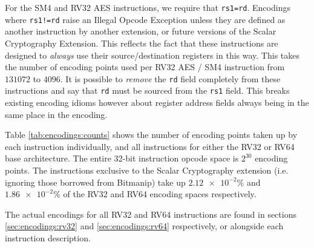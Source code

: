 For the SM4 and RV32 AES instructions, we require that {\tt rs1=rd}.
Encodings where {\tt rs1!=rd} raise an Illegal Opcode Exception unless
they are defined as another instruction by another extension, or
future versions of the Scalar Cryptography Extension.
This reflects the fact that these instructions are designed to {\em always}
use their source/destination registers in this way.
This takes the number of encoding points used per RV32 AES / SM4 instruction
from $131072$ to $4096$.
It is possible to {\em remove} the {\tt rd} field completely from these
instructions and say that {\tt rd} must be sourced from the {\tt rs1}
field.
This breaks existing encoding idioms however about register address fields
always being in the same place in the encoding.

Table \ref{tab:encodings:counts} shows the number of encoding points
taken up by each instruction individually, and all instructions for either
the RV32 or RV64 base architecture.
The entire 32-bit instruction opcode space is $2^{30}$ encoding points.
The instructions exclusive to the Scalar Cryptography extension
(i.e. ignoring those borrowed from Bitmanip)
take up $\num{2.12e-2}\%$
and     $\num{1.86e-2}\%$
of the RV32 and RV64 encoding spaces respectively.

The actual encodings for all RV32 and RV64 instructions are
found in sections
\ref{sec:encodings:rv32}
and
\ref{sec:encodings:rv64}
respectively, or alongside each instruction description.

